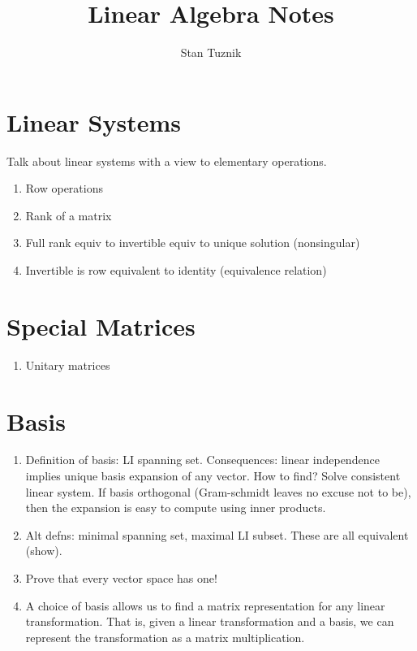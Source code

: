 

\title{Linear Algebra Notes}
\author{Stan Tuznik}
  


\maketitle
\tableofcontents


\chapter{Linear Systems}
Talk about linear systems with a view to elementary operations.
\begin{enumerate}
	\item Row operations
	\item Rank of a matrix
	\item Full rank equiv to invertible equiv to unique solution (nonsingular)
	\item Invertible is row equivalent to identity (equivalence relation)
\end{enumerate}


\chapter{Special Matrices}
\begin{enumerate}
	\item Unitary matrices
\end{enumerate}





\chapter{Basis}

\begin{enumerate}
	\item Definition of basis: LI spanning set. Consequences: linear independence implies unique basis expansion of any vector. How to find? Solve consistent linear system. If basis orthogonal (Gram-schmidt leaves no excuse not to be), then the expansion is easy to compute using inner products. 
	\item Alt defns: minimal spanning set, maximal LI subset. These are all equivalent (show).	
	\item Prove that every vector space has one!
	\item A choice of basis allows us to find a matrix representation for any linear transformation. That is, given a linear transformation and a basis, we can represent the transformation as a matrix multiplication.
\end{enumerate}


